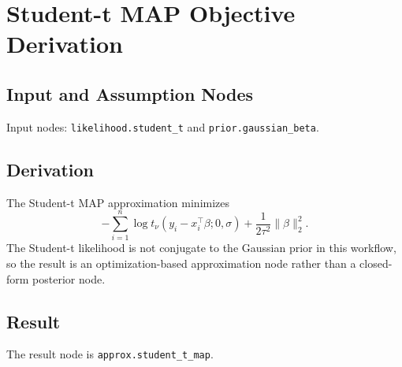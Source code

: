 \section{Student-t MAP Objective Derivation}
\label{deriv:student-t-map-objective}

\subsection{Input and Assumption Nodes}
Input nodes: \texttt{likelihood.student\_t} and \texttt{prior.gaussian\_beta}.

\subsection{Derivation}
The Student-t MAP approximation minimizes
\[
  -\sum_{i=1}^n \log t_\nu(y_i-x_i^\top\beta;0,\sigma)
  +
  \frac{1}{2\tau^2}\|\beta\|_2^2.
\]
The Student-t likelihood is not conjugate to the Gaussian prior in this workflow, so the result is an optimization-based approximation node rather than a closed-form posterior node.

\subsection{Result}
The result node is \texttt{approx.student\_t\_map}.
